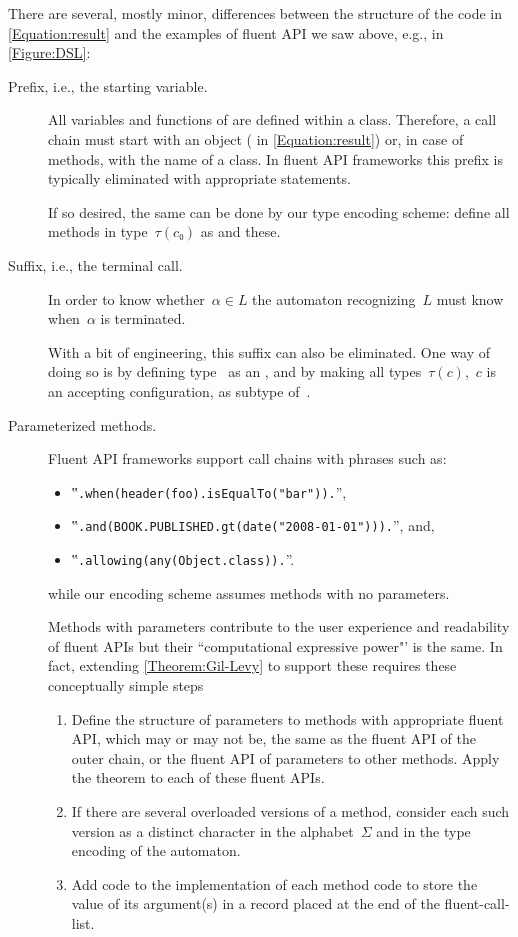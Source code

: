 There are several, mostly minor, differences between the structure of the \Java code
in \cref{Equation:result}
and the examples of fluent API we saw above, e.g., in \cref{Figure:DSL}:
\begin{description}
  \item[Prefix, i.e., the starting  variable.]
  All variables and functions of \Java are defined within a class.
  Therefore, a call chain must start with an object ( in \cref{Equation:result})
  or, in case of  methods, with the name of a class.
  In fluent API frameworks this prefix is typically eliminated
  with appropriate  statements.
  \par
  If so desired, the same can be done by our type encoding scheme: define all
  methods in type~$τ(c₀)$ as  and  these.
  \item[Suffix, i.e., the terminal  call.]
  In order to know whether~$α∈L$ the automaton recognizing~$L$ must
  know when~$α$ is terminated.
  \par
  With a bit of engineering, this suffix can also be eliminated.
  One way of doing so is by defining type~ as an , and by making all types~$τ(c)$,~$c$ is
  an accepting configuration, as subtype of~.
  \item[Parameterized methods.]
  Fluent API frameworks support call chains with phrases such as:
  \begin{itemize}
    \item ‟\lstinline{.when(header(foo).isEqualTo("bar")).}”,
    \item ‟\lstinline{.and(BOOK.PUBLISHED.gt(date("2008-01-01"))).}”, and,
    \item ‟\lstinline{.allowing(any(Object.class)).}”.
  \end{itemize}
  while our encoding scheme assumes methods with no parameters.  
  \par
    Methods with parameters contribute to the user
      experience and readability of fluent APIs but their ``computational expressive power"' is the same.
      In fact, extending
      \cref{Theorem:Gil-Levy} to support these requires these conceptually simple steps 
      \begin{enumerate}
        \item Define the structure of parameters to methods with appropriate fluent API, which may or
          may not be, the same as the fluent API of the outer chain, or the fluent API of parameters to
          other methods. Apply the theorem to each of these fluent APIs.
        \item
          If there are several overloaded versions of a method, consider each such version as a distinct
          character in the alphabet~$Σ$ and in the type encoding of the automaton.
        \item
          Add code to the implementation of each method code to store the 
          value of its argument(s) in a record placed at the end of the fluent-call-list. 
      \end{enumerate}
\end{description}

